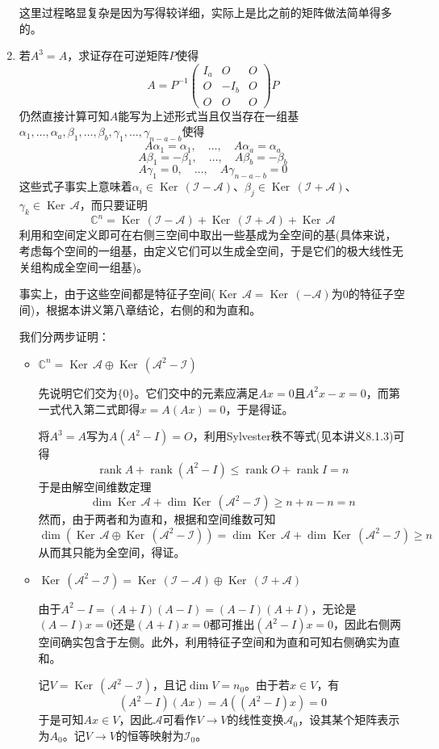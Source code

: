 \documentclass[a4paper,UTF8,fontset=windows]{ctexart}
\DeclareMathOperator{\rank}{rank}
\DeclareMathOperator{\Ker}{Ker\,}
\newcommand*{\ma}{\mathcal{A}}
\newcommand*{\mi}{\mathcal{I}}
\newcommand*{\note}{\noindent *}
\begin{document}
\begin{enumerate}
    \note 这里过程略显复杂是因为写得较详细，实际上是比之前的矩阵做法简单得多的。

    \item 若$A^3=A$，求证存在可逆矩阵$P$使得
    $$A=P^{-1}\begin{pmatrix}I_a&O&O\\O&-I_b&O\\O&O&O\end{pmatrix}P$$
    仍然直接计算可知$A$能写为上述形式当且仅当存在一组基$\alpha_1,\dots,\alpha_a,\beta_1,\dots,\beta_b,\gamma_1,\dots,\gamma_{n-a-b}$使得
    $$A\alpha_1=\alpha_1,\quad\dots,\quad A\alpha_a=\alpha_a$$
    $$A\beta_1=-\beta_1,\quad\dots,\quad A\beta_b=-\beta_b$$
    $$A\gamma_1=0,\quad\dots,\quad A\gamma_{n-a-b}=0$$
    这些式子事实上意味着$\alpha_i\in\Ker(\mi-\ma)$、$\beta_j\in\Ker(\mi+\ma)$、$\gamma_k\in\Ker\ma$，而只要证明
    $$\mathbb{C}^n=\Ker(\mi-\ma)+\Ker(\mi+\ma)+\Ker\ma$$
    利用和空间定义即可在右侧三空间中取出一些基成为全空间的基(具体来说，考虑每个空间的一组基，由定义它们可以生成全空间，于是它们的极大线性无关组构成全空间一组基)。

    \note 事实上，由于这些空间都是特征子空间($\Ker\ma=\Ker(-\ma)$为0的特征子空间)，根据本讲义第八章结论，右侧的和为直和。

    我们分两步证明：
    \begin{itemize}
        \item $\mathbb{C}^n=\Ker\ma\oplus\Ker(\ma^2-\mi)$
        
        先说明它们交为$\{0\}$。它们交中的元素应满足$Ax=0$且$A^2x-x=0$，而第一式代入第二式即得$x=A(Ax)=0$，于是得证。

        将$A^3=A$写为$A(A^2-I)=O$，利用Sylvester秩不等式(见本讲义8.1.3)可得
        $$\rank A+\rank(A^2-I)\le\rank O+\rank I=n$$
        于是由解空间维数定理
        $$\dim\Ker\ma+\dim\Ker(\ma^2-\mi)\ge n+n-n=n$$
        然而，由于两者和为直和，根据和空间维数可知
        $$\dim(\Ker\ma\oplus\Ker(\ma^2-\mi))=\dim\Ker\ma+\dim\Ker(\ma^2-\mi)\ge n$$
        从而其只能为全空间，得证。

        \item $\Ker(\ma^2-\mi)=\Ker(\mi-\ma)\oplus\Ker(\mi+\ma)$
        
        由于$A^2-I=(A+I)(A-I)=(A-I)(A+I)$，无论是$(A-I)x=0$还是$(A+I)x=0$都可推出$(A^2-I)x=0$，因此右侧两空间确实包含于左侧。此外，利用特征子空间和为直和可知右侧确实为直和。

        记$V=\Ker(\ma^2-\mi)$，且记$\dim V=n_0$。由于若$x\in V$，有
        $$(A^2-I)(Ax)=A((A^2-I)x)=0$$
        于是可知$Ax\in V$，因此$\ma$可看作$V\to V$的线性变换$\ma_0$，设其某个矩阵表示为$A_0$。记$V\to V$的恒等映射为$\mi_0$。


\end{itemize}
\end{enumerate}
\end{document}
